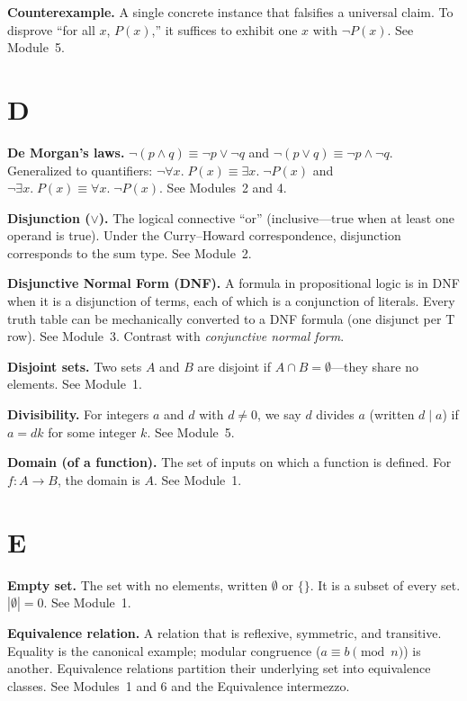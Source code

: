 \documentclass[11pt]{article}
\begin{document}
\textbf{Counterexample.} A single concrete instance that falsifies a universal claim. To disprove ``for all $x$, $P(x)$,'' it suffices to exhibit one $x$ with $\lnot P(x)$. See Module~5.

\section*{D}

\textbf{De Morgan's laws.} $\lnot(p \wedge q) \equiv \lnot p \vee \lnot q$ and $\lnot(p \vee q) \equiv \lnot p \wedge \lnot q$. Generalized to quantifiers: $\lnot \forall x.\; P(x) \equiv \exists x.\; \lnot P(x)$ and $\lnot \exists x.\; P(x) \equiv \forall x.\; \lnot P(x)$. See Modules~2 and 4.

\textbf{Disjunction ($\vee$).} The logical connective ``or'' (inclusive---true when at least one operand is true). Under the Curry--Howard correspondence, disjunction corresponds to the sum type. See Module~2.

\textbf{Disjunctive Normal Form (DNF).} A formula in propositional logic is in DNF when it is a disjunction of terms, each of which is a conjunction of literals. Every truth table can be mechanically converted to a DNF formula (one disjunct per T row). See Module~3. Contrast with \emph{conjunctive normal form}.

\textbf{Disjoint sets.} Two sets $A$ and $B$ are disjoint if $A \cap B = \emptyset$---they share no elements. See Module~1.

\textbf{Divisibility.} For integers $a$ and $d$ with $d \neq 0$, we say $d$ divides $a$ (written $d \mid a$) if $a = dk$ for some integer $k$. See Module~5.

\textbf{Domain (of a function).} The set of inputs on which a function is defined. For $f : A \to B$, the domain is $A$. See Module~1.

\section*{E}

\textbf{Empty set.} The set with no elements, written $\emptyset$ or $\{\}$. It is a subset of every set. $|\emptyset| = 0$. See Module~1.

\textbf{Equivalence relation.} A relation that is reflexive, symmetric, and transitive. Equality is the canonical example; modular congruence ($a \equiv b \pmod n$) is another. Equivalence relations partition their underlying set into equivalence classes. See Modules~1 and 6 and the Equivalence intermezzo.
\end{document}
